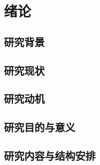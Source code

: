 \section{绪论} %
\subsection{研究背景}

\subsection{研究现状}

\subsection{研究动机}

\subsection{研究目的与意义}

\subsection{研究内容与结构安排}


